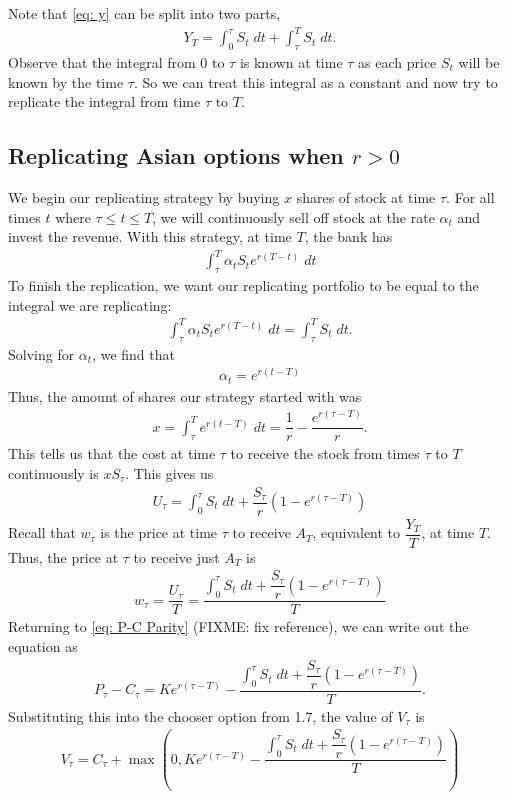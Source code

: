 \documentclass[reqno]{amsart}
\begin{document}
Note that \eqref{eq: y} can be split into
two parts, 
\begin{align}
     Y_T = \int_0^\tau S_t \; dt + \int_\tau^T S_t \; dt.
\end{align}
Observe that the integral from $0$ to $\tau$ is known at time $\tau$ as each price $S_t$ will be known by the time $\tau$. So we can treat this integral as a constant and now try to replicate the integral from time $\tau$ to $T$.


\subsection{Replicating Asian options when $r > 0$}
We begin our replicating strategy by buying $x$ shares of stock at time $\tau$. For all times $t$ where $\tau \leq t \leq T$, we will continuously sell off stock at the rate $\alpha_t$ and invest the revenue.
With this strategy, at time $T$, the bank has 
\begin{align}
     \int_\tau^T \alpha_t S_t e^{r(T-t)} \; dt
\end{align}
To finish the replication, we want our replicating portfolio to be equal to the integral we are replicating:
\begin{align}
     \int_\tau^T \alpha_t S_t e^{r(T-t)} \; dt = \int_\tau^T S_t \; dt.
\end{align}
Solving for $\alpha_t$, we find that
\begin{align}
     \alpha_t = e^{r(t-T)}
\end{align}
Thus, the amount of shares our strategy started with was
\begin{align}
     x = \int_\tau^T e^{r(t-T)} \; dt = \dfrac{1}{r} - \dfrac{e^{r(\tau - T)}}{r}.
\end{align}
This tells us that the cost at time $\tau$ to receive the stock from times $\tau$ to $T$ continuously is $x S_\tau$. This gives us 
\begin{align}
     U_\tau = \int_0^\tau S_t \; dt + \dfrac{S_\tau}{r}\left( 1 - e^{r(\tau - T)} \right)
\end{align}
Recall that $w_\tau$ is the price at time $\tau$ to receive $A_T$, equivalent to $\dfrac{Y_T}{T}$, at time $T$.
Thus, the price at $\tau$ to receive just $A_T$ is 
\begin{align}
     w_\tau = \dfrac{U_\tau}{T} = \dfrac{\int_0^\tau S_t \; dt + \dfrac{S_\tau}{r}\left( 1 - e^{r(\tau - T)} \right)}{T}
\end{align}
Returning to \eqref{eq: P-C Parity} (FIXME: fix reference), we can write out the equation as
\begin{align}
     P_\tau - C_\tau = Ke^{r(\tau - T)} - \dfrac{\int_0^\tau S_t \; dt + \dfrac{S_\tau}{r}\left( 1 - e^{r(\tau - T)} \right)}{T}.
\end{align}
Substituting this into the chooser option from 1.7, the value of $V_\tau$ is
\begin{align}
     V_\tau = C_\tau + \max(0, Ke^{r(\tau - T)} - \dfrac{\int_0^\tau S_t \; dt + \dfrac{S_\tau}{r}\left( 1 - e^{r(\tau - T)} \right)}{T})
\end{align}
\end{document}
